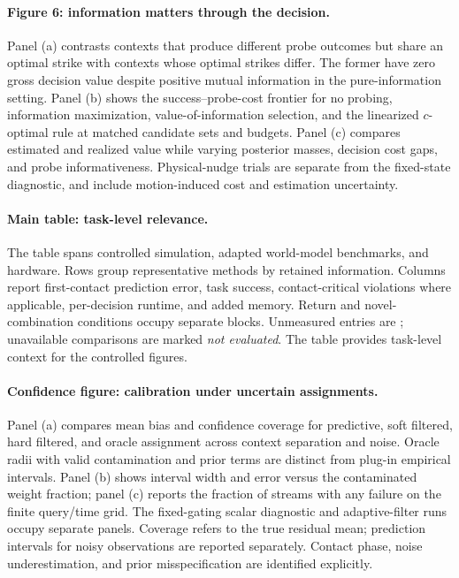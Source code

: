\paragraph{Figure 6: information matters through the decision.}
Panel (a) contrasts contexts that produce different probe outcomes but share an optimal strike with contexts whose optimal strikes differ. The former have zero gross decision value despite positive mutual information in the pure-information setting. Panel (b) shows the success--probe-cost frontier for no probing, information maximization, value-of-information selection, and the linearized $c$-optimal rule at matched candidate sets and budgets. Panel (c) compares estimated and realized value while varying posterior masses, decision cost gaps, and probe informativeness. Physical-nudge trials are separate from the fixed-state diagnostic, and include motion-induced cost and estimation uncertainty.

\paragraph{Main table: task-level relevance.}
The table spans controlled simulation, adapted world-model benchmarks, and hardware. Rows group representative methods by retained information. Columns report first-contact prediction error, task success, contact-critical violations where applicable, per-decision runtime, and added memory. Return and novel-combination conditions occupy separate blocks. Unmeasured entries are \placeholder{}; unavailable comparisons are marked \emph{not evaluated}. The table provides task-level context for the controlled figures.

\paragraph{Confidence figure: calibration under uncertain assignments.}
Panel (a) compares mean bias and confidence coverage for predictive, soft filtered, hard filtered, and oracle assignment across context separation and noise. Oracle radii with valid contamination and prior terms are distinct from plug-in empirical intervals. Panel (b) shows interval width and error versus the contaminated weight fraction; panel (c) reports the fraction of streams with any failure on the finite query/time grid. The fixed-gating scalar diagnostic and adaptive-filter runs occupy separate panels. Coverage refers to the true residual mean; prediction intervals for noisy observations are reported separately. Contact phase, noise underestimation, and prior misspecification are identified explicitly.

